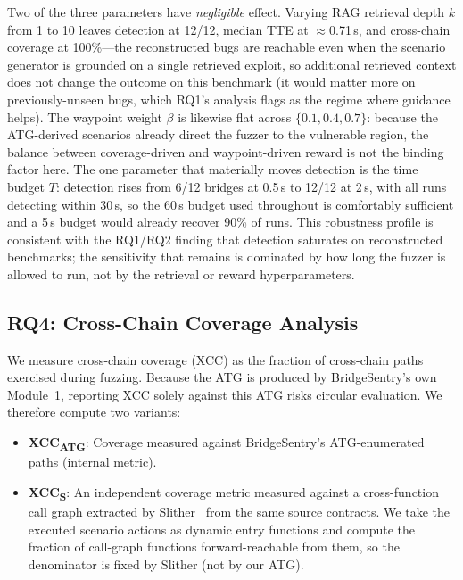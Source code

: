 \documentclass[journal]{IEEEtran}
\begin{document}
Two of the three parameters have \emph{negligible} effect. Varying RAG retrieval depth $k$ from 1 to 10 leaves detection at 12/12, median TTE at $\approx$0.71\,s, and cross-chain coverage at 100\%---the reconstructed bugs are reachable even when the scenario generator is grounded on a single retrieved exploit, so additional retrieved context does not change the outcome on this benchmark (it would matter more on previously-unseen bugs, which RQ1's analysis flags as the regime where guidance helps). The waypoint weight $\beta$ is likewise flat across $\{0.1,0.4,0.7\}$: because the ATG-derived scenarios already direct the fuzzer to the vulnerable region, the balance between coverage-driven and waypoint-driven reward is not the binding factor here. The one parameter that materially moves detection is the time budget $T$: detection rises from 6/12 bridges at 0.5\,s to 12/12 at 2\,s, with all runs detecting within 30\,s, so the 60\,s budget used throughout is comfortably sufficient and a 5\,s budget would already recover 90\% of runs. This robustness profile is consistent with the RQ1/RQ2 finding that detection saturates on reconstructed benchmarks; the sensitivity that remains is dominated by how long the fuzzer is allowed to run, not by the retrieval or reward hyperparameters.

\subsection{RQ4: Cross-Chain Coverage Analysis}

We measure cross-chain coverage (XCC) as the fraction of cross-chain paths exercised during fuzzing. Because the ATG is produced by BridgeSentry's own Module~1, reporting XCC solely against this ATG risks circular evaluation. We therefore compute two variants:

\begin{itemize}
    \item \textbf{XCC\textsubscript{ATG}}: Coverage measured against BridgeSentry's ATG-enumerated paths (internal metric).
    \item \textbf{XCC\textsubscript{S}}: An independent coverage metric measured against a cross-function call graph extracted by Slither~\cite{feist2019slither} from the same source contracts. We take the executed scenario actions as dynamic entry functions and compute the fraction of call-graph functions forward-reachable from them, so the denominator is fixed by Slither (not by our ATG).
\end{itemize}
\end{document}
